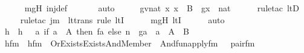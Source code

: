 \begin{isabellebody}
\ \ \ \ \isamarkupfalse%
\ mgH\ inj{\isacharunderscore}{\kern0pt}def\ \isanewline
\ \ \ \ \isamarkupfalse%
\ auto\isanewline
\ \ \isamarkupfalse%
\ \isamarkupfalse%
\ gvnat{\isacharcolon}{\kern0pt}\ {\isachardoublequoteopen}{\isasymAnd}x{\isachardot}{\kern0pt}\ x\ {\isasymin}\ B\ {\isasymLongrightarrow}\ g{\isacharbackquote}{\kern0pt}x\ {\isasymin}\ nat{\isachardoublequoteclose}\ \isanewline
\ \ \ \ \isamarkupfalse%
{\isacharparenleft}{\kern0pt}rule{\isacharunderscore}{\kern0pt}tac\ ltD{\isacharparenright}{\kern0pt}\isanewline
\ \ \ \ \isamarkupfalse%
{\isacharparenleft}{\kern0pt}rule{\isacharunderscore}{\kern0pt}tac\ j{\isacharequal}{\kern0pt}m\ \ lt{\isacharunderscore}{\kern0pt}trans{\isacharcomma}{\kern0pt}\ rule\ ltI{\isacharparenright}{\kern0pt}\isanewline
\ \ \ \ \isamarkupfalse%
\ mgH\ ltI\isanewline
\ \ \ \ \isamarkupfalse%
\ auto\isanewline
\isanewline
\ \ \isamarkupfalse%
\ h\ \ {\isachardoublequoteopen}h\ {\isasymequiv}\ {\isacharbraceleft}{\kern0pt}\ {\isacharless}{\kern0pt}a{\isacharcomma}{\kern0pt}\ if\ a\ {\isasymin}\ A\ then\ f{\isacharbackquote}{\kern0pt}a\ else\ n\ {\isacharhash}{\kern0pt}{\isacharplus}{\kern0pt}\ g{\isacharbackquote}{\kern0pt}a{\isachargreater}{\kern0pt}\ {\isachardot}{\kern0pt}\ a\ {\isasymin}\ A\ {\isasymunion}\ B\ {\isacharbraceright}{\kern0pt}{\isachardoublequoteclose}\ \isanewline
\isanewline
\ \ \isamarkupfalse%
\ hfm\ \ {\isachardoublequoteopen}hfm\ {\isasymequiv}\ Or{\isacharparenleft}{\kern0pt}Exists{\isacharparenleft}{\kern0pt}Exists{\isacharparenleft}{\kern0pt}And{\isacharparenleft}{\kern0pt}Member{\isacharparenleft}{\kern0pt}{}{\isacharcomma}{\kern0pt}\ {}{\isacharparenright}{\kern0pt}{\isacharcomma}{\kern0pt}\ And{\isacharparenleft}{\kern0pt}fun{\isacharunderscore}{\kern0pt}apply{\isacharunderscore}{\kern0pt}fm{\isacharparenleft}{\kern0pt}{}{\isacharcomma}{\kern0pt}\ {}{\isacharcomma}{\kern0pt}\ {}{\isacharparenright}{\kern0pt}{\isacharcomma}{\kern0pt}\ pair{\isacharunderscore}{\kern0pt}fm{\isacharparenleft}{\kern0pt}{}{\isacharcomma}{\kern0pt}\ {}{\isacharcomma}{\kern0pt}\ {}{\isacharparenright}{\kern0pt}{\isacharparenright}{\kern0pt}{\isacharparenright}{\kern0pt}{\isacharparenright}{\kern0pt}{\isacharparenright}{\kern0pt}{\isacharcomma}{\kern0pt}\isanewline

\end{isabellebody}

